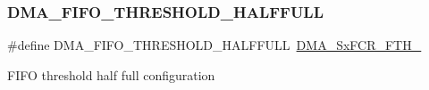\subsubsection{\texorpdfstring{DMA\_FIFO\_THRESHOLD\_HALFFULL}{DMA\_FIFO\_THRESHOLD\_HALFFULL}}
{\footnotesize\ttfamily \#define D\+M\+A\+\_\+\+F\+I\+F\+O\+\_\+\+T\+H\+R\+E\+S\+H\+O\+L\+D\+\_\+\+H\+A\+L\+F\+F\+U\+LL~\mbox{\hyperlink{group___peripheral___registers___bits___definition_ga63716e11d34bca95927671055aa63fe8}{D\+M\+A\+\_\+\+Sx\+F\+C\+R\+\_\+\+F\+T\+H\+\_}}}

F\+I\+FO threshold half full configuration 